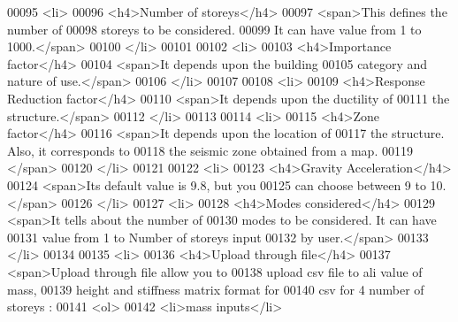 \begin{DoxyCode}
00095                             <li>
00096                                 <h4>Number of storeys</h4>
00097                                 <span>This defines the number of 
00098                                 storeys to be considered. 
00099                                 It can have value from 1 to 1000.</span>
00100                             </li>
00101 
00102                             <li>
00103                                 <h4>Importance factor</h4>
00104                                 <span>It depends upon the building 
00105                                 category and nature of use.</span>
00106                             </li>
00107                             
00108                             <li>
00109                                 <h4>Response Reduction factor</h4>
00110                                 <span>It depends upon the ductility of 
00111                                 the structure.</span>
00112                             </li>
00113 
00114                             <li>
00115                                 <h4>Zone factor</h4>
00116                                 <span>It depends upon the location of 
00117                                 the structure. Also, it corresponds to 
00118                                 the seismic zone obtained from a map.
00119                                 </span>
00120                             </li>
00121 
00122                             <li>
00123                                 <h4>Gravity Acceleration</h4>
00124                                 <span>Its default value is 9.8, but you 
00125                                 can choose between 9 to 10.</span>
00126                             </li>
00127                             <li>
00128                                 <h4>Modes considered</h4>
00129                                 <span>It tells about the number of 
00130                                 modes to be considered. It can have 
00131                                 value from 1 to Number of storeys input 
00132                                 by user.</span>
00133                             </li>
00134 
00135                             <li>
00136                                 <h4>Upload through file</h4>
00137                                 <span>Upload through file allow you to 
00138                                 upload csv file to ali value of mass, 
00139                                 height and stiffness matrix format for 
00140                                 csv for 4 number of storeys :
00141                                 <ol>
00142                                     <li>mass inputs</li>

\end{DoxyCode}
